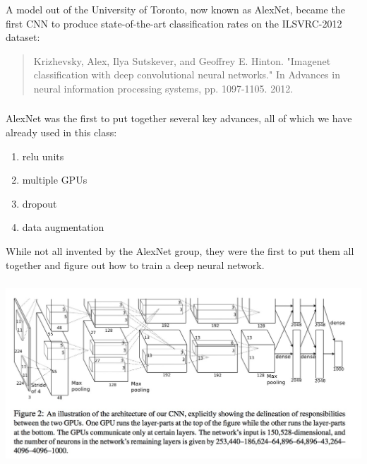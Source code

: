 \documentclass[xetex,mathserif,serif,aspectratio=169]{beamer}
\begin{document}
\begin{frame}[fragile] \frametitle{} \oldB \small


A model out of the University of Toronto, now known as AlexNet,
became the first CNN to produce state-of-the-art classification
rates on the ILSVRC-2012 dataset:
\begin{quote}
Krizhevsky, Alex, Ilya Sutskever, and Geoffrey E. Hinton. "Imagenet classification with deep convolutional neural networks." In Advances in neural information processing systems, pp. 1097-1105. 2012.
\end{quote}

\end{frame}

\begin{frame}[fragile] \frametitle{} \oldB \small


AlexNet was the first to put together several key advances, all
of which we have already used in this class:
\begin{enumerate}
\item relu units
\item multiple GPUs
\item dropout
\item data augmentation
\end{enumerate}
While not all invented by the AlexNet group, they were the first
to put them all together and figure out how to train a deep
neural network.

\end{frame}

\begin{frame}[fragile] \frametitle{} \oldB \small

\begin{center}
\includegraphics[width=\textwidth]{img/alexNet.jpg}
\end{center}

\end{frame}
\end{document}
